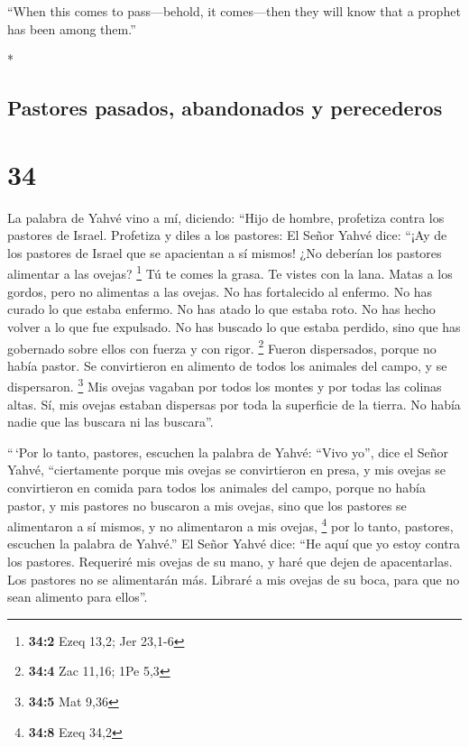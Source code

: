 \begin{paracol}{2}
\begin{otherlanguage}{english}
 ``When this comes to pass---behold, it comes---then they
will know that a prophet has been among them.''

\end{otherlanguage}

\switchcolumn[0]*

\hypertarget{pastores-pasados-abandonados-y-perecederos}{%
\subsection{Pastores pasados, abandonados y
perecederos}\label{pastores-pasados-abandonados-y-perecederos}}

\hypertarget{section-66}{%
\section{34}\label{section-66}}

 La palabra de Yahvé vino a mí, diciendo: 
``Hijo de hombre, profetiza contra los pastores de Israel. Profetiza y
diles a los pastores: El Señor Yahvé dice: ``¡Ay de los pastores de
Israel que se apacientan a sí mismos! ¿No deberían los pastores
alimentar a las ovejas? \footnote{\textbf{34:2} Ezeq 13,2; Jer 23,1-6}
 Tú te comes la grasa. Te vistes con la lana. Matas a los
gordos, pero no alimentas a las ovejas.  No has
fortalecido al enfermo. No has curado lo que estaba enfermo. No has
atado lo que estaba roto. No has hecho volver a lo que fue expulsado. No
has buscado lo que estaba perdido, sino que has gobernado sobre ellos
con fuerza y con rigor. \footnote{\textbf{34:4} Zac 11,16; 1Pe 5,3}
 Fueron dispersados, porque no había pastor. Se
convirtieron en alimento de todos los animales del campo, y se
dispersaron. \footnote{\textbf{34:5} Mat 9,36}  Mis ovejas
vagaban por todos los montes y por todas las colinas altas. Sí, mis
ovejas estaban dispersas por toda la superficie de la tierra. No había
nadie que las buscara ni las buscara''.

 ``\,`Por lo tanto, pastores, escuchen la palabra de
Yahvé:  ``Vivo yo'', dice el Señor Yahvé, ``ciertamente
porque mis ovejas se convirtieron en presa, y mis ovejas se convirtieron
en comida para todos los animales del campo, porque no había pastor, y
mis pastores no buscaron a mis ovejas, sino que los pastores se
alimentaron a sí mismos, y no alimentaron a mis ovejas, \footnote{\textbf{34:8}
  Ezeq 34,2}  por lo tanto, pastores, escuchen la palabra
de Yahvé.''  El Señor Yahvé dice: ``He aquí que yo estoy
contra los pastores. Requeriré mis ovejas de su mano, y haré que dejen
de apacentarlas. Los pastores no se alimentarán más. Libraré a mis
ovejas de su boca, para que no sean alimento para ellos''.


\end{paracol}
